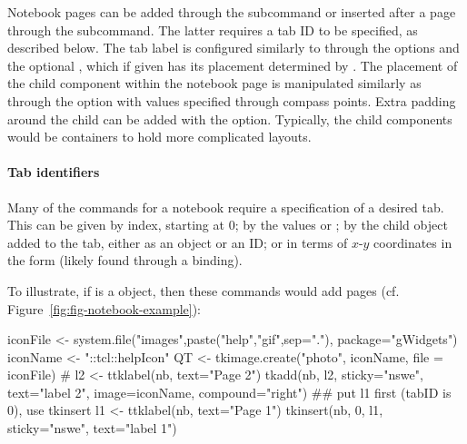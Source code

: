 Notebook pages can be added through the 
subcommand or inserted after a page through the
 subcommand. The latter requires a tab
ID to be specified, as described below. The tab label is configured
similarly to  through the options
 and the optional
, which if given has its placement
determined by .  The placement of the
child component within the notebook page is manipulated similarly as
 through the  option with
values specified through compass points. Extra padding around the
child can be added with the 
option. Typically, the child components would be containers to hold
more complicated layouts.

\paragraph{Tab identifiers} %
Many of the commands for a notebook require a specification of a desired tab. This can be given by index, starting at 0; by the values  or ; by the child object added to the tab, either as an \R\/ object or an ID; or in terms of $x$-$y$ coordinates in the form  (likely found through a binding).

To illustrate, if  is a  object, then these
commands would add pages (cf. Figure~\ref{fig:fig-notebook-example}):
\begin{Schunk}
\begin{Sinput}
 iconFile <- system.file("images",paste("help","gif",sep="."),
                         package="gWidgets")
 iconName <- "::tcl::helpIcon"
 QT <- tkimage.create("photo", iconName, file = iconFile)
 #
 l2 <- ttklabel(nb, text="Page 2")
 tkadd(nb, l2, sticky="nswe", text="label 2", 
     image=iconName, compound="right")
 ## put l1 first (tabID is 0), use tkinsert
 l1 <- ttklabel(nb, text="Page 1")
 tkinsert(nb, 0, l1, sticky="nswe", text="label 1")
\end{Sinput}
\end{Schunk}

